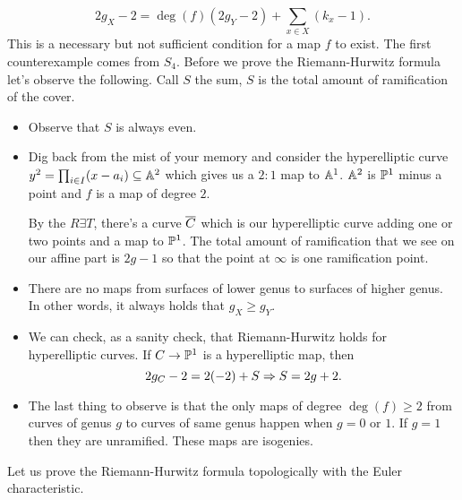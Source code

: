 \documentclass[12pt]{memoir}
\begin{document}
$$2g_X-2=\deg(f)(2g_Y-2)+\sum_{x\in X}(k_x-1).$$
This is a necessary but not sufficient condition for a map $f$ to exist. The first counterexample comes from $S_4$. Before we prove the Riemann-Hurwitz formula let's observe the following. Call $S$ the sum, $S$ is the total amount of ramification of the cover.
\begin{itemize}
    \item Observe that $S$ is always even. 
    \item Dig back from the mist of your memory and consider the hyperelliptic curve $y^2=\prod_{i\in I}(x-a_i)\subseteq\mathbb{A}^2$ which gives us a $2:1$ map to $\mathbb{A}^1$. $\mathbb{A}^2$ is $\mathbb{P}^1$ minus a point and $f$ is a map of degree $2$.\par
    By the $R\exists T$, there's a curve $\overline C$ which is our hyperelliptic curve adding one or two points and a map to $\mathbb{P}^1$. The total amount of ramification that we see on our affine part is $2g-1$ so that the point at $\infty$ is one ramification point. 
    \item There are no maps from surfaces of lower genus to surfaces of higher genus. In other words, it always holds that $g_X\geq g_Y$.
    \item We can check, as a sanity check, that Riemann-Hurwitz holds for hyperelliptic curves. If $C\to\mathbb{P}^1$ is a hyperelliptic map, then 
    $$2g_C-2=2(-2)+S\Rightarrow S=2g+2.$$
    \item The last thing to observe is that the only maps of degree $\deg(f)\geq 2$ from curves of genus $g$ to curves of same genus happen when $g=0$ or $1$. If $g=1$ then they are unramified. These maps are isogenies. 
\end{itemize}

Let us prove the Riemann-Hurwitz formula topologically with the Euler characteristic.
\end{document}
